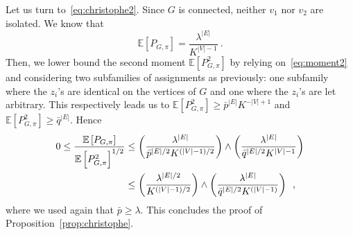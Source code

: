 \documentclass[final]{colt2026}
\newcommand{\1}{\mathbf{1}}
\newcommand{\bbE}{\mathbb{E}}
\newcommand{\pa}[1]{\left(#1\right)}
\newcommand{\cro}[1]{\left[#1\right]}
\begin{document}
\medskip 

Let us turn to~\eqref{eq:christophe2}. Since $G$ is connected, neither $v_1$ nor $v_2$ are isolated.
We know that 
\[
\mathbb{E}[P_{G,\pi}]= \frac{\lambda^{|E|}}{K^{|V|-1}}\ . 
\]
Then, we lower bound the second moment $\mathbb{E}[P^2_{G,\pi}]$ by relying on~\eqref{eq:moment2} and considering two subfamilies of assignments as previously: one subfamily where the $z_i$'s are identical on the vertices of $G$ and one where the $z_i$'s are let arbitrary. This respectively leads us to 
 $\mathbb{E}[P^2_{G,\pi}]\geq \bar{p}^{|E|}K^{-|V|+ 1}$ and $\mathbb{E}[P^2_{G,\pi}]\geq \bar{q}^{|E|}$. Hence
\begin{align*}
0\leq { \bbE\cro{P_{G, \pi}} \over\bbE\cro{P_{G, \pi}^2}^{1/2}} 
& \leq \pa{\lambda^{|E|}\over \bar p^{|E|/2} K^{(|V|-1)/2}} \wedge \pa{\lambda^{|E|}\over \bar q^{|E|/2} K^{|V|-1}}\\
&\leq \pa{\lambda^{|E|/2}\over K^{(|V|-1)/2}} \wedge \pa{\lambda^{|E|}\over \bar q^{|E|/2} K^{(|V|-1)}}\enspace ,
\end{align*}
where we used again that $\bar{p}\geq \lambda$.
This concludes the proof of Proposition~\ref{prop:christophe}. 




%
\end{document}
